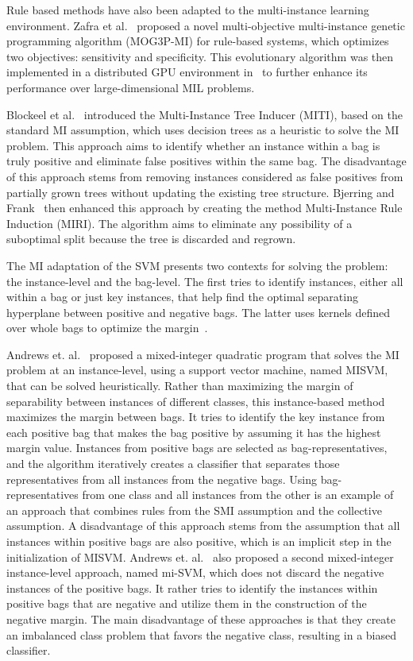 \documentclass[reqno]{vcuthesis}
\numberwithin{equation}{chapter}
\begin{document}
Rule based methods have also been adapted to the multi-instance learning environment. Zafra et al.~\cite{zafra2011multiplege} proposed a novel multi-objective multi-instance genetic programming algorithm (MOG3P-MI) for rule-based systems, which optimizes two objectives: sensitivity and specificity. This evolutionary algorithm was then implemented in a distributed GPU environment in~\cite{cano2015speeding} to further enhance its performance over large-dimensional MIL problems.

Blockeel et al.~\cite{Blockeel2005} introduced the Multi-Instance Tree Inducer (MITI), based on the standard MI assumption, which uses decision trees as a heuristic to solve the MI problem. This approach aims to identify whether an instance within a bag is truly positive and eliminate false positives within the same bag. The disadvantage of this approach stems from removing instances considered as false positives from partially grown trees without updating the existing tree structure. Bjerring and Frank~\cite{Bjerring2011} then enhanced this approach by creating the method Multi-Instance Rule Induction (MIRI). The algorithm aims to eliminate any possibility of a suboptimal split because the tree is discarded and regrown. 

The MI adaptation of the SVM presents two contexts for solving the problem: the instance-level and the bag-level. The first tries to identify instances, either all within a bag or just key instances, that help find the optimal separating hyperplane between positive and negative bags. The latter uses kernels defined over whole bags to optimize the margin~\cite{Doran201479}. 

Andrews et. al.~\cite{Andrews2002} proposed a mixed-integer quadratic program that solves the MI problem at an instance-level, using a support vector machine, named MISVM, that can be solved heuristically. Rather than maximizing the margin of separability between instances of different classes, this instance-based method maximizes the margin between bags. It tries to identify the key instance from each positive bag that makes the bag positive by assuming it has the highest margin value. Instances from positive bags are selected as bag-representatives, and the algorithm iteratively creates a classifier that separates those representatives from all instances from the negative bags. Using bag-representatives from one class and all instances from the other is an example of an approach that combines rules from the SMI assumption and the collective assumption. A disadvantage of this approach stems from the assumption that all instances within positive bags are also positive, which is an implicit step in the initialization of MISVM. Andrews et. al.~\cite{Andrews2002} also proposed a second mixed-integer instance-level approach, named mi-SVM, which does not discard the negative instances of the positive bags. It rather tries to identify the instances within positive bags that are negative and utilize them in the construction of the negative margin. The main disadvantage of these approaches is that they create an imbalanced class problem that favors the negative class, resulting in a biased classifier.
\end{document}
